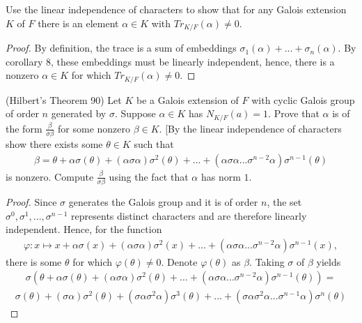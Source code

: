 \documentclass[10pt]{article}
\newenvironment{problem}[2][Problem]{\begin{trivlist}
		\item[\hskip \labelsep {\bfseries #1}\hskip \labelsep {\bfseries #2.}]}{\end{trivlist}}
\begin{document}
	\begin{problem}{2.21}
		Use the linear independence of characters to show that for any Galois extension $K$ of $F$ there is an element $\alpha \in K$ with $Tr_{K/F}(\alpha) \not= 0$.
		\begin{proof}
			By definition, the trace is a sum of embeddings $\sigma_1(\alpha) + ... + \sigma_n(\alpha)$. By corollary 8, these embeddings must be linearly independent, hence, there is a nonzero $\alpha \in K$ for which $Tr_{K/F}(\alpha) \not = 0$.
		\end{proof}
	\end{problem}
	
	\begin{problem}{2.23}
		(Hilbert's Theorem 90) Let $K$ be a Galois extension of $F$ with cyclic Galois group of order $n$ generated by $\sigma$. Suppose $\alpha \in K$ has $N_{K/F}(a)=1$. Prove that $\alpha$ is of the form $\frac{\beta}{\sigma\beta}$ for some nonzero $\beta \in K$. [By the linear independence of characters show there exists some $\theta \in K$ such that 
		\begin{align*}
			\beta = \theta + \alpha\sigma(\theta) + (\alpha\sigma\alpha)\sigma^2(\theta) + ... + (\alpha\sigma\alpha...\sigma^{n-2}\alpha)\sigma^{n-1}(\theta)
		\end{align*}
		is nonzero. Compute $\frac{\beta}{\sigma\beta}$ using the fact that $\alpha$ has norm $1$.
		\begin{proof}
			Since $\sigma$ generates the Galois group and it is of order $n$, the set $\sigma^0, \sigma^1, ..., \sigma^{n-1}$ represents distinct characters and are therefore linearly independent. Hence, for the function
			\begin{align*}
				\varphi: x \mapsto x + \alpha\sigma(x) + (\alpha\sigma\alpha)\sigma^2(x) + ... + (\alpha\sigma\alpha...\sigma^{n-2}\alpha)\sigma^{n-1}(x),
			\end{align*}
			there is some $\theta$ for which $\varphi(\theta) \not= 0$. Denote $\varphi(\theta)$ as $\beta$. Taking $\sigma$ of $\beta$ yields
			\begin{align*}
				\sigma(\theta + \alpha\sigma(\theta) + (\alpha\sigma\alpha)\sigma^2(\theta) + ... + (\alpha\sigma\alpha...\sigma^{n-2}\alpha)\sigma^{n-1}(\theta)) = 
			\end{align*}
			\begin{align*}
				\sigma(\theta) + (\sigma\alpha)\sigma^2(\theta) + (\sigma\alpha\sigma^2\alpha)\sigma^3(\theta) + ... + (\sigma\alpha\sigma^2\alpha...\sigma^{n-1}\alpha)\sigma^{n}(\theta)

\end{align*}
\end{proof}
\end{problem}
\end{document}
